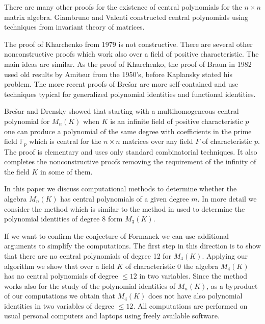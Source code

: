 \documentclass[12pt]{amsart}
\theoremstyle{definition}
\begin{document}
There are many other proofs for the existence of central polynomials for the $n\times n$ matrix algebra.
Giambruno and Valenti \cite{GiVa} constructed central polynomials using techniques from invariant theory of matrices.

The proof of Kharchenko \cite{Kh} from 1979 is not constructive. There are several other nonconstructive proofs which work also over a field of positive characteristic.
The main ideas are similar. As the proof of Kharchenko, the proof of Braun \cite{Bra} in 1982
used old results by Amitsur from the 1950's,
before Kaplansky stated his problem. The more recent proofs of Bre\v{s}ar \cite{Bre1, Bre2}
are more self-contained and use techniques typical
for generalized polynomial identities and functional identities.

Bre\v{s}ar and Drensky \cite{BreDr} showed that starting with a multihomogeneous central polynomial for $M_n(K)$ when $K$ is an infinite field of positive characteristic $p$
one can produce a polynomial of the same degree with coefficients in the prime field ${\mathbb F}_p$ which is central for the $n\times n$ matrices over any field $F$ of characteristic $p$.
The proof is elementary and uses only standard combinatorial techniques. It also completes the nonconstructive proofs removing the requirement of the infinity of the field $K$ in some of them.

In this paper we discuss computational methods to determine whether the algebra $M_n(K)$ has central polynomials of a given degree $m$.
In more detail we consider the method which is similar to the method in \cite{DrKas1}
used to determine the polynomial identities of degree 8 form $M_3(K)$.

If we want to confirm the conjecture of Formanek we can use additional arguments to simplify the computations.
The first step in this direction is to show that there are no central polynomials of degree 12 for $M_4(K)$.
Applying our algorithm we show that over a field $K$ of characteristic 0 the algebra $M_4(K)$ has no central polynomials of degree $\leq 12$ in two variables.
Since the method works also for the study of the polynomial identities of $M_n(K)$,
as a byproduct of our computations we obtain that $M_4(K)$ does not have also polynomial identities in two variables of degree $\leq 12$.
All computations are performed on usual personal computers and laptops using freely available software.
\end{document}
